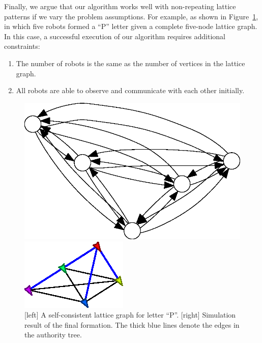 Finally, we argue that our algorithm works well with non-repeating lattice patterns if we vary the problem assumptions.
%
For example, as shown in Figure~\ref{fig:p-letter}, in which five robots formed a ``P''
letter given a complete five-node lattice graph. 
%
In this case, a successful execution of our algorithm requires additional constraints: 
\begin{enumerate}
  \item The number of robots is the same as the number of vertices in the lattice graph.
  \item All robots are able to observe and communicate with each other initially.
\end{enumerate}
\begin{figure}
    \centering
  \begin{minipage}[b]{0.45\linewidth}
  \includegraphics[width=.9\columnwidth]{figs/pletter}
  \end{minipage}
   \begin{minipage}[b]{0.45\linewidth}
     \includegraphics[width=.9\columnwidth]{figs/p-formation}
   \end{minipage}
   \caption{[left] A self-consistent lattice graph for letter ``P''. [right]
     Simulation result of the final formation. 
     The thick blue lines denote the edges in the authority tree.}
   \label{fig:p-letter}
 \end{figure}
 

